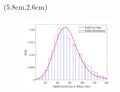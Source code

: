 \begin{frame}
\begin{center}
\begin{textblock*}{\textwidth}(5.8cm,2.6cm)
\begin{figure}
\includegraphics[width=0.43\textwidth]{fig/Fig5-3-delay-fitting.pdf}
\end{figure}
\end{textblock*}
\end{center}

\end{frame}


